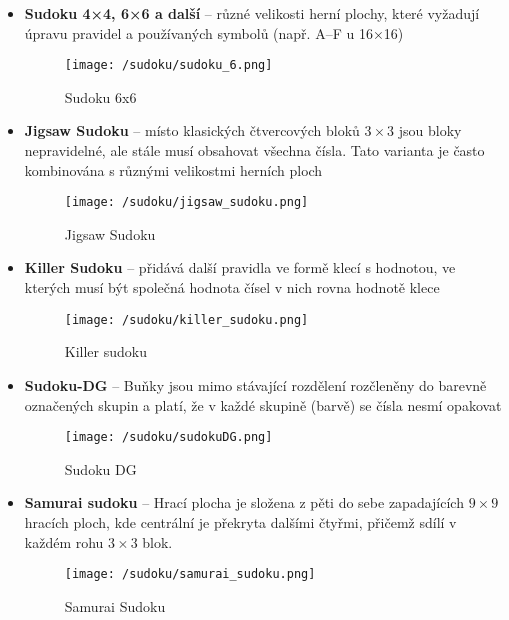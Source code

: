 \documentclass[
  master,
  program=ainfvs,
  biblatex,
  figures=true,
  tables=false,
  sourcecodes,
  glossaries,
  index
]{kidiplom}
\begin{document}
\begin{itemize}
	\item \textbf{Sudoku 4×4, 6×6 a další} – různé velikosti herní plochy, které vyžadují úpravu pravidel a používaných symbolů (např. A–F u 16×16)

	\begin{figure}[!htb]
		\centering
		\texttt{[image: /sudoku/sudoku\_6.png]}
		\caption[Sudoku 6x6]{Sudoku 6x6}
		\label{sudoku_6}
	\end{figure}
	
	\item \textbf{Jigsaw Sudoku} – místo klasických čtvercových bloků $3 \times 3$ jsou bloky nepravidelné, ale stále musí obsahovat všechna čísla. Tato varianta je často kombinována s různými velikostmi herních ploch
	
	\begin{figure}[!htb]
		\centering
		\texttt{[image: /sudoku/jigsaw\_sudoku.png]}
		\caption[Jigsaw Sudoku]{Jigsaw Sudoku}
		\label{sudoku_jigsaw}
	\end{figure}
	
	\item \textbf{Killer Sudoku} – přidává další pravidla ve formě klecí s hodnotou, ve kterých musí být společná hodnota čísel v nich rovna hodnotě klece
	
		\begin{figure}[!htb]
		\centering
		\texttt{[image: /sudoku/killer\_sudoku.png]}
		\caption[Killer sudoku]{Killer sudoku}
		\label{sudoku_killer}
	\end{figure}
	
	\item \textbf{Sudoku-DG} – Buňky jsou mimo stávající rozdělení rozčleněny do barevně označených skupin a platí, že v každé skupině (barvě) se čísla nesmí opakovat
	
	\begin{figure}[!htb]
		\centering
		\texttt{[image: /sudoku/sudokuDG.png]}
		\caption[Sudoku DG]{Sudoku DG}
		\label{sudoku_DG}
	\end{figure}
	
	\newpage
	\item \textbf{Samurai sudoku} – Hrací plocha je složena z pěti do sebe zapadajících $9 \times 9$ hracích ploch, kde centrální je překryta dalšími čtyřmi, přičemž sdílí v každém rohu $3 \times 3$ blok.
	
		\begin{figure}[!htb]
		\centering
		\texttt{[image: /sudoku/samurai\_sudoku.png]}
		\caption[Samurai Sudoku]{Samurai Sudoku}
		\label{sudoku_samurai}
	\end{figure}
\end{itemize}
\end{document}
